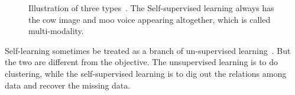 \documentclass[final]{cvpr}
\begin{document}
\begin{figure}[ht]
\begin{center}
\end{center}
   \caption{Illustration of three types~\cite{liu2020self}. The Self-supervised learning always has the cow image and moo voice appearing altogether, which is called multi-modality.
   }
\label{fig:sscompare}
\end{figure}

Self-learning sometimes be treated as a branch of un-supervised learning~\cite{liu2020self}. But the two are different from the objective. The unsupervised learning is to do clustering, while the self-supervised learning is to dig out the relations among data and recover the missing data.

{\small


}
\end{document}
